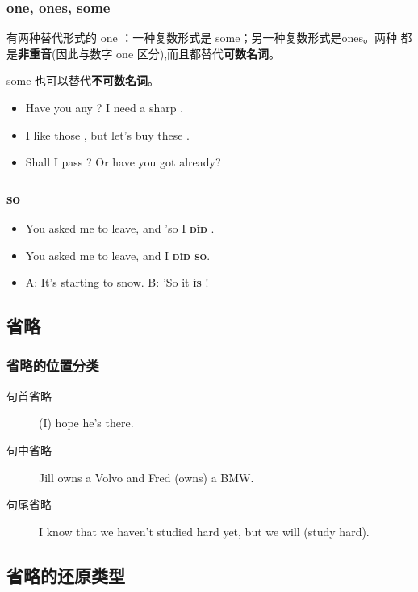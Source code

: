 \subsubsection{one, ones, some}

有两种替代形式的 one ：一种复数形式是 some；另一种复数形式是ones。两种
都是\textbf{非重音}(因此与数字 one 区分),而且都替代\textbf{可数名词}。

some 也可以替代\textbf{不可数名词}。
\begin{itemize}
\item Have you any ? I need a sharp .
\item I like those , but let's buy these .

\item Shall I pass ? Or have you got  already?
\end{itemize}


\subsubsection{so}
\begin{itemize}
\item You asked me to leave, and 'so I  \textbf{\textsc{d\`id}} .
\item You asked me to leave, and  I \textbf{\textsc{d\`id so}}.
\item A: It's starting to snow. B: 'So it \textbf{\textsc{\`is}} !
\end{itemize}

\subsection{省略}

\subsubsection{省略的位置分类}

\begin{description}
\item[句首省略] (I) hope he's there.
\item[句中省略] Jill owns a Volvo and Fred (owns) a BMW.
\item[句尾省略] I know that we haven't studied hard yet, but we will (study hard).
\end{description}

\subsection{省略的还原类型}

